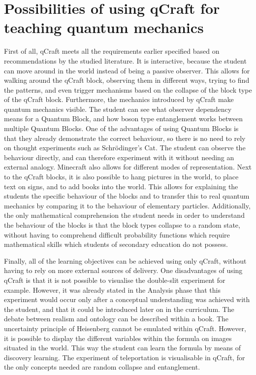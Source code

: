 \documentclass[11pt,twoside]{report} %
\begin{document}
\section{Possibilities of using qCraft for teaching quantum mechanics}

First of all, qCraft meets all the requirements earlier specified based on recommendations by the studied literature. It is interactive, because the student can move around in the world instead of being a passive observer. This allows for walking around the qCraft block, observing them in different ways, trying to find the patterns, and even trigger mechanisms based on the collapse of the block type of the qCraft block. Furthermore, the mechanics introduced by qCraft make quantum mechanics visible. The student can see what observer dependency means for a Quantum Block, and how boson type entanglement works between multiple Quantum Blocks. One of the advantages of using Quantum Blocks is that they already demonstrate the correct behaviour, so there is no need to rely on thought experiments such as Schrödinger's Cat. The student can observe the behaviour directly, and can therefore experiment with it without needing an external analogy. Minecraft also allows for different modes of representation. Next to the qCraft blocks, it is also possible to hang pictures in the world, to place text on signs, and to add books into the world. This allows for explaining the students the specific behaviour of the blocks and to transfer this to real quantum mechanics by comparing it to the behaviour of elementary particles. Additionally, the only mathematical comprehension the student needs in order to understand the behaviour of the blocks is that the block types collapse to a random state, without having to comprehend difficult probability functions which require mathematical skills which students of secondary education do not possess.

Finally, all of the learning objectives can be achieved using only qCraft, without having to rely on more external sources of delivery. One disadvantages of using qCraft is that it is not possible to visualise the double-slit experiment for example. However, it was already stated in the Analysis phase that this experiment would occur only after a conceptual understanding was achieved with the student, and that it could be introduced later on in the curriculum. The debate between realism and ontology can be described within a book. The uncertainty principle of Heisenberg cannot be emulated within qCraft. However, it is possible to display the different variables within the formula on images situated in the world. This way the student can learn the formula by means of discovery learning. The experiment of teleportation is visualisable in qCraft, for the only concepts needed are random collapse and entanglement.
\end{document}
